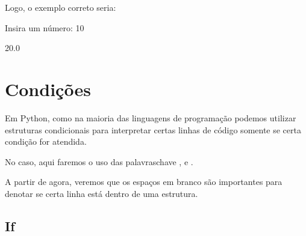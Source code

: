 \documentclass[letterpaper,10pt,english]{jupyterBook}
\begin{document}
\sphinxAtStartPar
Logo, o exemplo correto seria:

\begin{sphinxVerbatim}[commandchars=\\\{\}]
   
  
\end{sphinxVerbatim}

\begin{sphinxVerbatim}[commandchars=\\\{\}]
Insira um número:  10
\end{sphinxVerbatim}

\begin{sphinxVerbatim}[commandchars=\\\{\}]
20.0
\end{sphinxVerbatim}


\section{Condições}
\label{\detokenize{chapters/2:condicoes}}
\sphinxAtStartPar
Em Python, como na maioria das linguagens de programação podemos utilizar estruturas condicionais para interpretar certas linhas de código somente se certa condição for atendida.

\sphinxAtStartPar
No caso, aqui faremos o uso das palavras\sphinxhyphen{}chave ,  e .

\sphinxAtStartPar
A partir de agora, veremos que os espaços em branco são importantes para denotar se certa linha está dentro de uma estrutura.


\subsection{If}
\label{\detokenize{chapters/2:if}}
\begin{sphinxVerbatim}[commandchars=\\\{\}]
  
   
      
\end{sphinxVerbatim}
\end{document}
